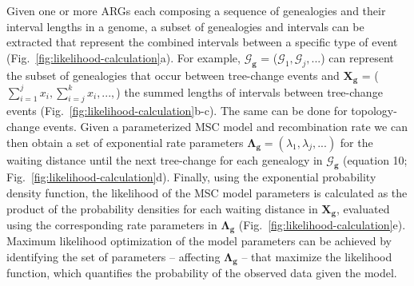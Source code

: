 \documentclass[11pt]{article}
\begin{document}
Given one or more ARGs each composing a sequence of genealogies and
their interval lengths in a genome, 
a subset of genealogies and intervals can be extracted that represent 
the combined intervals between a specific type of event
(Fig.~\ref{fig:likelihood-calculation}a).
For example, $\boldsymbol{\mathcal{G}_g}$ = ($\mathcal{G}_1, \mathcal{G}_j, ...$)
can represent
the subset of genealogies that occur between tree-change events
and $\boldsymbol{X_g}$ = ($\sum_{i=1}^j x_i, \sum_{i=j}^{k} x_i, ..., $)
the summed lengths of intervals between tree-change events
(Fig.~\ref{fig:likelihood-calculation}b-c).
The same can be done for topology-change events.
Given a parameterized MSC model and recombination rate
we can then obtain a set of exponential rate parameters
$\boldsymbol{\Lambda_g} = (\lambda_1, \lambda_j, ...)$ for the waiting distance 
until the next tree-change for each genealogy in $\boldsymbol{\mathcal{G}_g}$ 
(equation 10; Fig.~\ref{fig:likelihood-calculation}d).
Finally, using the exponential probability density function,
the likelihood of the MSC model parameters is calculated as the
product of the probability densities for each waiting distance
in $\boldsymbol{X_g}$, evaluated using the corresponding rate parameters in 
$\boldsymbol{\Lambda_g}$
(Fig.~\ref{fig:likelihood-calculation}e).
Maximum likelihood optimization of the model parameters can be achieved
by identifying the set of parameters -- affecting $\boldsymbol{\Lambda_g}$ -- that
maximize the likelihood function, which quantifies the probability of 
the observed data given the model.
\end{document}
